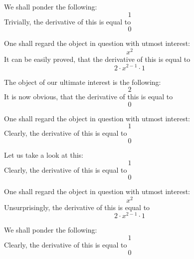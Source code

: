 \documentclass{article}
\begin{document}
We shall ponder the following:
\begin{equation}
1 
\end{equation}
Trivially, the derivative of this is equal to
\begin{equation}
0 
\end{equation}

One shall regard the object in question with utmost interest:
\begin{equation}
x ^{2 } 
\end{equation}
It can be easily proved, that the derivative of this is equal to
\begin{equation}
2 \cdot x ^{2 - 1 } \cdot 1 
\end{equation}

The object of our ultimate interest is the following:
\begin{equation}
2 
\end{equation}
It is now obvious, that the derivative of this is equal to
\begin{equation}
0 
\end{equation}

One shall regard the object in question with utmost interest:
\begin{equation}
1 
\end{equation}
Clearly, the derivative of this is equal to
\begin{equation}
0 
\end{equation}

Let us take a look at this:
\begin{equation}
1 
\end{equation}
Clearly, the derivative of this is equal to
\begin{equation}
0 
\end{equation}

One shall regard the object in question with utmost interest:
\begin{equation}
x ^{2 } 
\end{equation}
Unsurprisingly, the derivative of this is equal to
\begin{equation}
2 \cdot x ^{2 - 1 } \cdot 1 
\end{equation}

We shall ponder the following:
\begin{equation}
1 
\end{equation}
Clearly, the derivative of this is equal to
\begin{equation}
0 
\end{equation}
\end{document}
